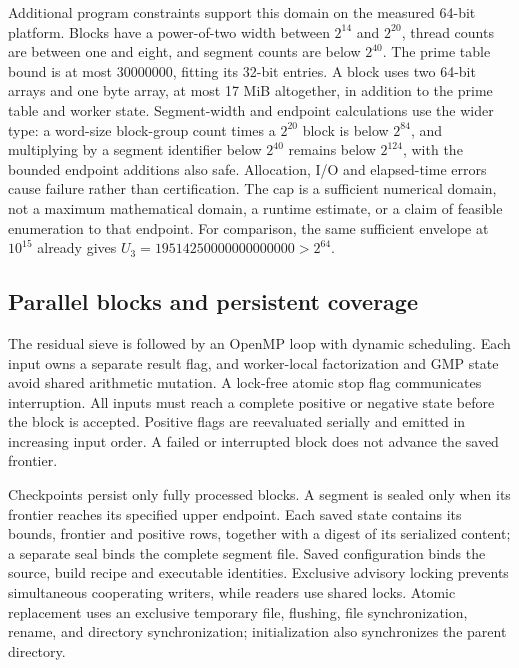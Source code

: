 \documentclass[11pt,a4paper]{article}
\theoremstyle{remark}
\begin{document}
Additional program constraints support this domain on the measured 64-bit
platform. Blocks have a power-of-two width between $2^{14}$ and $2^{20}$,
thread counts are between one and eight, and segment counts are below $2^{40}$.
The prime table bound is at most $30000000$, fitting its 32-bit entries.
A block uses two 64-bit arrays and one byte array, at most 17 MiB altogether,
in addition to the prime table and worker state. Segment-width and endpoint
calculations use the wider type: a word-size block-group count times a
$2^{20}$ block is below $2^{84}$, and multiplying by a segment identifier
below $2^{40}$ remains below $2^{124}$, with the bounded endpoint additions
also safe. Allocation, I/O and elapsed-time errors cause failure rather than
certification. The cap is a sufficient numerical domain, not a maximum
mathematical domain, a runtime estimate, or a claim of feasible enumeration
to that endpoint. For comparison, the same sufficient envelope at $10^{15}$
already gives $U_3=19514250000000000000>2^{64}$.

\subsection{Parallel blocks and persistent coverage}
The residual sieve is followed by an OpenMP loop with dynamic scheduling.
Each input owns a separate result flag, and worker-local factorization and
GMP state avoid shared arithmetic mutation. A lock-free atomic stop flag
communicates interruption. All inputs must reach a complete positive or
negative state before the block is accepted. Positive flags are reevaluated
serially and emitted in increasing input order. A failed or interrupted
block does not advance the saved frontier.

Checkpoints persist only fully processed blocks. A segment is sealed only
when its frontier reaches its specified upper endpoint. Each saved state
contains its bounds, frontier and positive rows, together with a digest of
its serialized content; a separate seal binds the complete segment file.
Saved configuration binds the source, build recipe and executable identities.
Exclusive advisory locking prevents simultaneous cooperating writers, while
readers use shared locks. Atomic replacement uses an exclusive temporary
file, flushing, file synchronization, rename, and directory synchronization;
initialization also synchronizes the parent directory.
\end{document}
